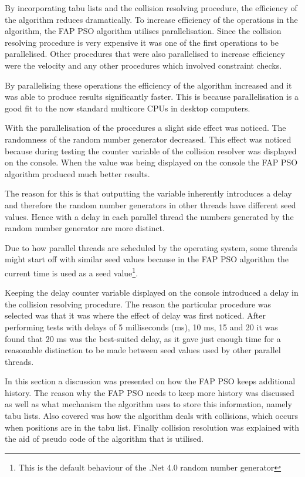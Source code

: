 By incorporating tabu lists and the collision resolving procedure, the efficiency of the algorithm reduces dramatically. To increase efficiency of the operations in the algorithm, the \gls{FAP} \gls{PSO} algorithm utilises parallelisation. Since the collision resolving procedure is very expensive it was one of the first operations to be parallelised. Other procedures that were also parallelised to increase efficiency were the velocity and any other procedures which involved constraint checks.

By parallelising these operations the efficiency of the algorithm increased and it was able to produce results significantly faster. This is because parallelisation is a good fit to the now standard multicore CPUs in desktop computers.

With the parallelisation of the procedures a slight side effect was noticed. The randomness of the random number generator decreased. This effect was noticed because during testing the counter variable of the collision resolver was displayed on the console. When the value was being displayed on the console the \gls{FAP} \gls{PSO} algorithm produced much better results. 

The reason for this is that outputting the variable inherently introduces a delay and therefore the random number generators in other threads have different seed values. Hence with a delay in each parallel thread the numbers generated by the random number generator are more distinct. 

Due to how parallel threads are scheduled by the operating system, some threads might start off with similar seed values because in  the \gls{FAP} \gls{PSO} algorithm the current time is used as a seed value\footnote{This is the default behaviour of the .Net 4.0 random number generator}.

Keeping the delay counter variable displayed on the console introduced a delay in the collision resolving procedure. The reason the particular procedure was selected was that it was where the effect of delay was first noticed. After performing tests with delays of 5 milliseconds (ms), 10 ms, 15 and 20 it was found that 20 ms was the best-suited delay, as it gave just enough time for a reasonable distinction to be made between seed values used by other parallel threads.

In this section a discussion was presented on how the \gls{FAP} \gls{PSO} keeps additional history. The reason why the \gls{FAP} \gls{PSO} needs to keep more history was discussed as well as what mechanism the algorithm uses to store this information, namely tabu lists. Also covered was how the algorithm deals with collisions, which occurs when positions are in the tabu list. Finally collision resolution was explained with the aid of pseudo code of the algorithm that is utilised.

